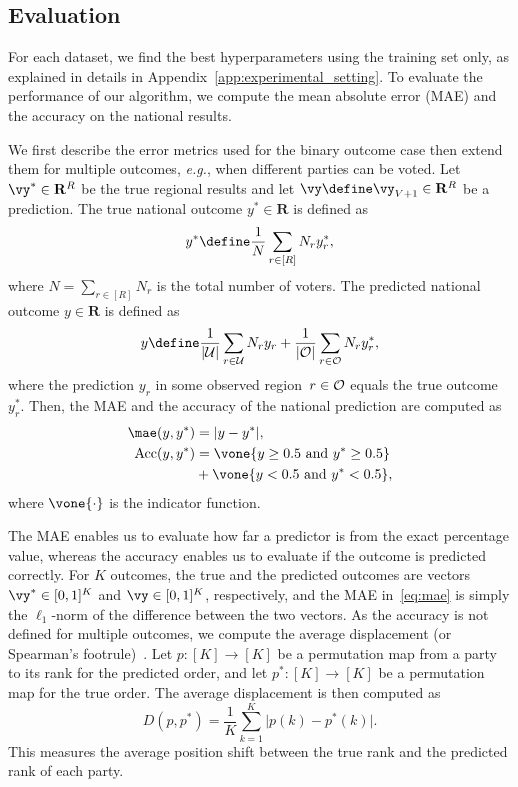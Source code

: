 \subsection{Evaluation}

For each dataset, we find the best hyperparameters using the training set only, as explained in details in Appendix~\ref{app:experimental_setting}.
To evaluate the performance of our algorithm, we compute the mean absolute error (MAE) and the accuracy on the national results.

We first describe the error metrics used for the binary outcome case then extend them for multiple outcomes, \textit{e.g.}, when different parties can be voted.
Let $\vy^* \in \mathbf{R}^R$ be the true regional results and let $\vy \define \vy_{V+1} \in \mathbf{R}^R$ be a prediction.
The true national outcome $y^* \in \mathbf{R}$ is defined as
\begin{equation}
	y^* \define \frac{1}{N} \sum_{r \in [R]} N_r y_r^*,
\end{equation}
where $N = \sum_{r \in [R]} N_r$ is the total number of voters.
The predicted national outcome $y \in \mathbf{R}$ is defined as
\begin{equation}
	y \define \frac{1}{\vert \Ubs \vert} \sum_{r \in \Ubs} N_r y_r + \frac{1}{\vert \Obs \vert} \sum_{r \in \Obs} N_r y_r^*,
\end{equation}
where the prediction $y_r$ in some observed region~$r \in \mathcal{O}$ equals the true outcome $y_r^*$.
Then, the MAE and the accuracy of the national prediction are computed as
\begin{align}
	\mae(y, y^*)         & = \vert y - y^* \vert, \label{eq:mae}                         \\
	\textrm{Acc}(y, y^*) & = \vone \{y \geq 0.5 \textrm{ and } y^* \geq 0.5\} \nonumber  \\
	                     & + \vone \{ y < 0.5 \textrm{ and } y^* < 0.5\}, \label{eq:acc}
\end{align}
where $\vone \{\cdot \}$ is the indicator function.

The MAE enables us to evaluate how far a predictor is from the exact percentage value, whereas the accuracy enables us to evaluate if the outcome is predicted correctly.
For $K$ outcomes, the true and the predicted outcomes are vectors $\vy^* \in [0, 1]^K$ and $\vy \in [0, 1]^K$, respectively, and the MAE in~\eqref{eq:mae} is simply the $\ell_1$-norm of the difference between the two vectors.
As the accuracy is not defined for multiple outcomes, we compute the average displacement (or Spearman's footrule)~\cite{diaconis1977spearman}.
Let \mbox{$p: [K] \rightarrow [K]$} be a permutation map from a party to its rank for the predicted order, and let \mbox{$p^*: [K] \rightarrow [K]$} be a permutation map for the true order.
The average displacement is then computed as
\begin{equation}
	\label{eq:displacement}
	D(p, p^*) = \frac{1}{K} \sum_{k=1}^K \vert p(k) - p^*(k) \vert.
\end{equation}
This measures the average position shift between the true rank and the predicted rank of each party.

